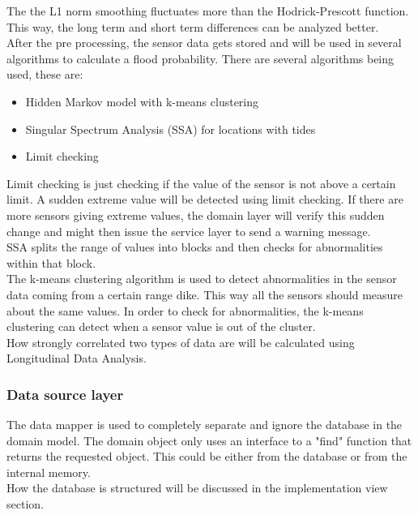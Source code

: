 The the L1 norm smoothing fluctuates more than the Hodrick-Prescott function. This way, the long term and short term differences can be analyzed better.\\

%
After the pre processing, the sensor data gets stored and will be used in several algorithms to calculate a flood probability.
There are several algorithms being used, these are:
\begin{itemize}
	\item Hidden Markov model with k-means clustering
	\item Singular Spectrum Analysis (SSA) for locations with tides
	\item Limit checking
\end{itemize}

Limit checking is just checking if the value of the sensor is not above a certain limit. A sudden extreme value will be detected using limit checking. If there are more sensors giving extreme values, the domain layer will verify this sudden change and might then issue the service layer to send a warning message.\\
SSA splits the range of values into blocks and then checks for abnormalities within that block.\\
The k-means clustering algorithm is used to detect abnormalities in the sensor data coming from a certain range dike. This way all the sensors should measure about the same values. In order to check for abnormalities, the k-means clustering can detect when a sensor value is out of the cluster.\\

How strongly correlated two types of data are will be calculated using Longitudinal Data Analysis.

\subsubsection*{Data source layer}
The data mapper \cite{Fowler:2002:PEA:579257} is used to completely separate and ignore the database in the domain model. The domain object only uses an interface to a "find" function that returns the requested object. This could be either from the database or from the internal memory.\\
How the database is structured will be discussed in the implementation view section.

